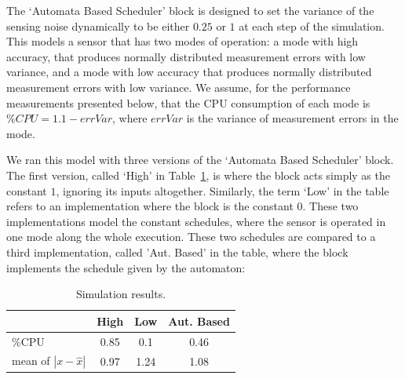 \documentclass{sig-alternate-ipsn13}
\begin{document}
The `Automata Based Scheduler' block is designed to set the variance of the sensing noise dynamically to be either $0.25$ or $1$ at each step of the simulation. This models a sensor that has two modes of operation: a mode with high accuracy, that produces normally distributed measurement errors with low variance, and a mode with low accuracy that produces normally distributed measurement errors with low variance. We assume, for the performance measurements presented below, that the CPU consumption of each mode is $\%CPU=1.1-errVar$, where $errVar$ is the variance of measurement errors in the mode.

We ran this model with three versions of the `Automata Based Scheduler' block. The first version, called `High' in Table~\ref{tbl:sim-results}, is where the block acts simply as the constant $1$, ignoring its inputs altogether. Similarly, the term `Low' in the table refers to an implementation where the block is the constant $0$. These two implementations model the constant schedules, where the sensor is operated in one mode along the whole execution. These two schedules are compared to a third implementation, called 'Aut. Based' in the table, where the block implements the schedule given by the automaton:
\begin{center}
\end{center}

%
%

\begin{table}
	\centering
	\begin{tabular}{ |  l  | c | c | c | }
		\hline
		&  High & Low & Aut. Based \\ \hline \hline
		\%CPU                    & 0.85 & 0.1  & 0.46 \\ \hline
		mean of $|x -\hat{x}|$ & 0.97 & 1.24 & 1.08 \\ \hline
	\end{tabular}
	\caption{Simulation results.}
	\label{tbl:sim-results}
\end{table}
\end{document}
